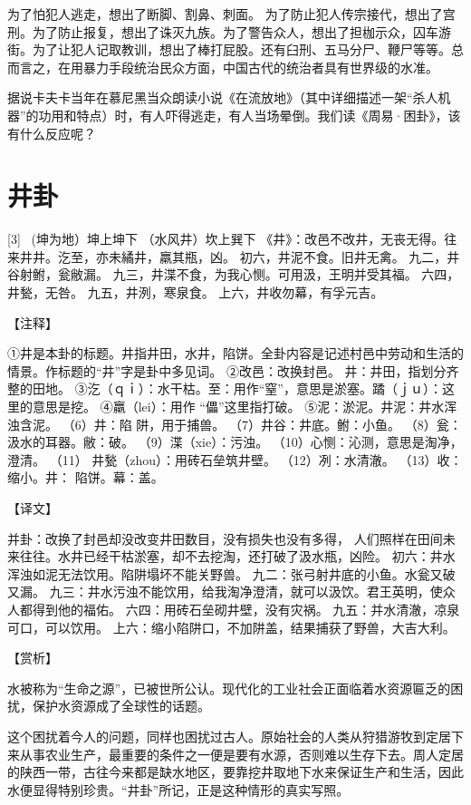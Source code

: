\documentclass[12pt,UTF8]{ctexbook}
\begin{document}
为了怕犯人逃走，想出了断脚、割鼻、刺面。 为了防止犯人传宗接代，想出了宫刑。为了防止报复，想出了诛灭九族。为了警告众人，想出了担枷示众，囚车游街。为了让犯人记取教训，想出了棒打屁股。还有臼刑、五马分尸、鞭尸等等。总而言之，在用暴力手段统治民众方面，中国古代的统治者具有世界级的水准。

据说卡夫卡当年在慕尼黑当众朗读小说《在流放地》（其中详细描述一架“杀人机器”的功用和特点）时，有人吓得逃走，有人当场晕倒。我们读《周易·困卦》，该有什么反应呢？

\chapter{井卦}
[3] \ (坤为地）坤上坤下
（水风井）坎上巽下
《井》：改邑不改井，无丧无得。往来井井。汔至，亦未繘井，羸其瓶，凶。
初六，井泥不食。旧井无禽。
九二，井谷射鲋，瓮敝漏。
九三，井渫不食，为我心恻。可用汲，王明并受其福。
六四，井甃，无咎。
九五，井洌，寒泉食。
上六，井收勿幕，有孚元吉。

【注释】

①井是本卦的标题。井指井田，水井，陷饼。全卦内容是记述村邑中劳动和生活的情景。作标题的“井”字是卦中多见词。
②改邑：改换封邑。 井：井田，指划分齐整的田地。
③汔（ｑｉ）：水干枯。至：用作“窒”，意思是淤塞。蹫（ｊｕ）：这里的意思是挖。
④羸（lei）：用作 “儡”这里指打破。
⑤泥：淤泥。井泥：井水浑浊含泥。
（6）井：陷 阱，用于捕兽。
（7）井谷：井底。鲋：小鱼。
（8）瓮：汲水的耳器。敝：破。
（9）渫（xie）：污浊。
（10）心恻：沁测，意思是淘净，澄清。
（11） 井甃（zhou）：用砖石垒筑井壁。
（12）冽：水清澈。
（13）收：缩小。井： 陷饼。幕：盖。

【译文】

并卦：改换了封邑却没改变井田数目，没有损失也没有多得， 人们照样在田间未来往往。水井已经干枯淤塞，却不去挖淘，还打破了汲水瓶，凶险。
初六：井水浑浊如泥无法饮用。陷阱塌坏不能关野兽。
九二：张弓射井底的小鱼。水瓮又破又漏。
九三：井水污浊不能饮用，给我淘净澄清，就可以汲饮。君王英明，使众人都得到他的福佑。
六四：用砖石垒砌井壁，没有灾祸。
九五：并水清澈，凉泉可口，可以饮用。
上六：缩小陷阱口，不加阱盖，结果捕获了野兽，大吉大利。

【赏析】

水被称为“生命之源”，已被世所公认。现代化的工业社会正面临着水资源匾乏的困扰，保护水资源成了全球性的话题。

这个困扰着今人的问题，同样也困扰过古人。原始社会的人类从狩猎游牧到定居下来从事农业生产，最重要的条件之一便是要有水源，否则难以生存下去。周人定居的陕西一带，古往今来都是缺水地区，要靠挖井取地下水来保证生产和生活，因此水便显得特别珍贵。“井卦”所记，正是这种情形的真实写照。
\end{document}
